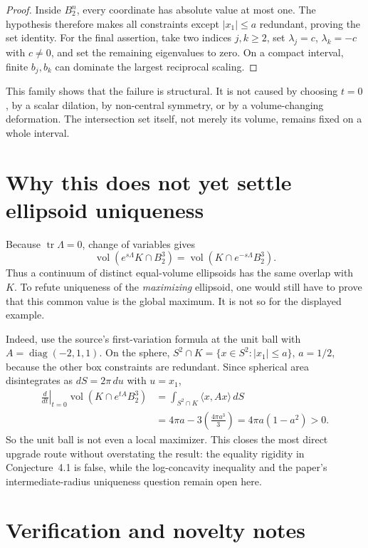 \documentclass[11pt]{article}
\newcommand{\vol}{\operatorname{vol}}
\newcommand{\B}{B_2}
\begin{document}
\begin{proof}
Inside \(\B^n\), every coordinate has absolute value at most one.  The
hypothesis therefore makes all constraints except \(|x_1|\le a\)
redundant, proving the set identity.  For the final assertion, take two
indices \(j,k\ge2\), set \(\lambda_j=c\), \(\lambda_k=-c\) with
\(c\ne0\), and set the remaining eigenvalues to zero.  On a compact
interval, finite \(b_j,b_k\) can dominate the largest reciprocal scaling.
\end{proof}

This family shows that the failure is structural.  It is not caused by
choosing \(t=0\), by a scalar dilation, by non-central symmetry, or by a
volume-changing deformation.  The intersection set itself, not merely its
volume, remains fixed on a whole interval.

\section{Why this does not yet settle ellipsoid uniqueness}

Because \(\operatorname{tr}\Lambda=0\), change of variables gives
\[
 \vol(e^{s\Lambda}K\cap\B^3)
 =\vol(K\cap e^{-s\Lambda}\B^3).
\]
Thus a continuum of distinct equal-volume ellipsoids has the same overlap
with \(K\).  To refute uniqueness of the \emph{maximizing} ellipsoid, one
would still have to prove that this common value is the global maximum.  It
is not so for the displayed example.

Indeed, use the source's first-variation formula at the unit ball with
\(A=\operatorname{diag}(-2,1,1)\).  On the sphere,
\(S^2\cap K=\{x\in S^2:|x_1|\le a\}\), \(a=1/2\), because the other box
constraints are redundant.  Since spherical area disintegrates as
\(dS=2\pi\,du\) with \(u=x_1\),
\begin{align*}
 \left.\frac d{dt}\right|_{t=0}
 \vol(K\cap e^{tA}\B^3)
 &=\int_{S^2\cap K}\langle x,Ax\rangle\,dS\\
 &=4\pi a-3\left(\frac{4\pi a^3}{3}\right)
 =4\pi a(1-a^2)>0.
\end{align*}
So the unit ball is not even a local maximizer.  This closes the most direct
upgrade route without overstating the result: the equality rigidity in
Conjecture~4.1 is false, while the log-concavity inequality and the paper's
intermediate-radius uniqueness question remain open here.

\section{Verification and novelty notes}
\end{document}
